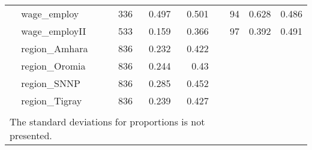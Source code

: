 \begin{table}[ht]
\begin{tabular}{llrrrlrrr}
   & wage\_employ &   336 & 0.497 & 0.501 &  &    94 & 0.628 & 0.486 \\ 
   & wage\_employII &   533 & 0.159 & 0.366 &  &    97 & 0.392 & 0.491 \\ 
   & region\_Amhara &   836 & 0.232 & 0.422 &  &  &  &  \\ 
   & region\_Oromia &   836 & 0.244 &  0.43 &  &  &  &  \\ 
   & region\_SNNP &   836 & 0.285 & 0.452 &  &  &  &  \\ 
   & region\_Tigray &   836 & 0.239 & 0.427 &  &  &  &  \\ 
    \bottomrule   
 \\[-1.8ex] \multicolumn{6}{l}{\scriptsize{The standard deviations for proportions is 
               not presented.}} 
\end{tabular}
\end{table}
